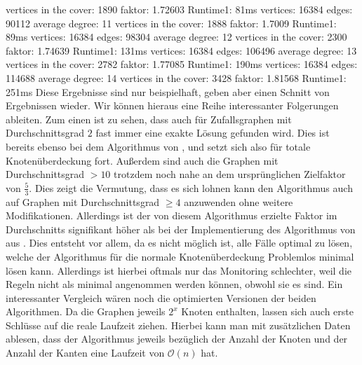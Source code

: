 \documentclass[12pt,onecolumn, notitlepage]{scrartcl}
\begin{document}
\newline vertices in the cover: 1890 faktor: 1.72603 Runtime1: 81ms
\newline vertices: 16384 edges: 90112 average degree: 11 
\newline vertices in the cover: 1888 faktor: 1.7009 Runtime1: 89ms
\newline vertices: 16384 edges: 98304 average degree: 12 
\newline vertices in the cover: 2300 faktor: 1.74639 Runtime1: 131ms
\newline vertices: 16384 edges: 106496 average degree: 13 
\newline vertices in the cover: 2782 faktor: 1.77085 Runtime1: 190ms
\newline vertices: 16384 edges: 114688 average degree: 14 
\newline vertices in the cover: 3428 faktor: 1.81568 Runtime1: 251ms \newline \newline \newline   
Diese Ergebnisse sind nur beispielhaft, geben aber einen Schnitt von Ergebnissen wieder. Wir können hieraus eine Reihe interessanter Folgerungen ableiten. \newline 
Zum einen ist zu sehen, dass auch für Zufallsgraphen mit Durchschnittsgrad $2$ fast immer eine exakte Lösung gefunden wird. Dies ist bereits ebenso bei dem Algorithmus von \cite{BraFer}, und setzt sich also für totale Knotenüberdeckung fort. \newline 
Außerdem sind auch die Graphen mit Durchschnittsgrad $>10$ trotzdem noch nahe an dem ursprünglichen Zielfaktor von $\frac{5}{3}$. Dies zeigt die Vermutung, dass es sich lohnen kann den Algorithmus auch auf Graphen mit Durchschnittsgrad $\geq 4$ anzuwenden ohne weitere Modifikationen. \newline 
Allerdings ist der von diesem Algorithmus erzielte Faktor im Durchschnitts signifikant höher als bei der Implementierung des Algorithmus von \cite{BraFer} aus \cite{KruBA}. Dies entsteht vor allem, da es nicht möglich ist, alle Fälle optimal zu lösen, welche der Algorithmus für die normale Knotenüberdeckung Problemlos minimal lösen kann. Allerdings ist hierbei oftmals nur das Monitoring schlechter, weil die Regeln nicht als minimal angenommen werden können, obwohl sie es sind. Ein interessanter Vergleich wären noch die optimierten Versionen der beiden Algorithmen. \newline  
Da die Graphen jeweils $2^x$ Knoten enthalten, lassen sich auch erste Schlüsse auf die reale Laufzeit ziehen. Hierbei kann man mit zusätzlichen Daten ablesen, dass der Algorithmus jeweils bezüglich der Anzahl der Knoten und der Anzahl der Kanten eine Laufzeit von $\mathcal O(n)$ hat. \newline 
\end{document}
